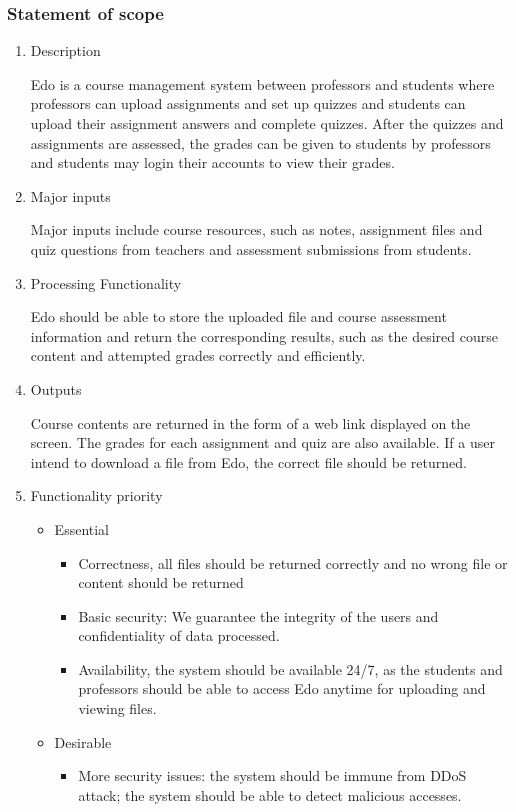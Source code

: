\documentclass[paper=a4, fontsize=11pt]{scrartcl}
\numberwithin{equation}{section}		%
\numberwithin{figure}{section}			%
\numberwithin{table}{section}				%
\begin{document}
\subsubsection{Statement of scope}
\begin{enumerate}
	\item Description
	\par Edo is a course management system between professors and students where professors can upload assignments and set up quizzes and students can upload their assignment answers and complete quizzes. After the quizzes and assignments are assessed, the grades can be given to students by professors and students may login their accounts to view their grades.
	\item Major inputs
	\par Major inputs include course resources, such as notes, assignment files and quiz questions from teachers and assessment submissions from students.
	\item Processing Functionality
	\par Edo should be able to store the uploaded file and course assessment information and return the corresponding results, such as the desired course content and attempted grades correctly and efficiently.
	\item Outputs
	\par Course contents are returned in the form of a web link displayed on the screen. The grades for each assignment and quiz are also available. If a user intend to download a file from Edo, the correct file should be returned.
	\item Functionality priority
	\begin{itemize}
		\item Essential
		\begin{itemize}
			\item Correctness, all files should be returned correctly and no wrong file or content should be returned
			\item Basic security: We guarantee the integrity of the users and confidentiality of data processed.
			\item Availability, the system should be available 24/7, as the students and professors should be able to access Edo anytime for uploading and viewing files.
		\end{itemize}
		\item Desirable
		\begin{itemize}
			\item More security issues: the system should be immune from DDoS attack; the system should be able to detect malicious accesses.

\end{itemize}
\end{itemize}
\end{enumerate}
\end{document}
